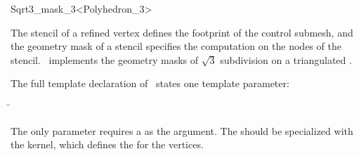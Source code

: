 \ccRefPageEnd


\begin{ccRefClass}{Sqrt3_mask_3<Polyhedron_3>}

\ccDefinition

The stencil of a refined vertex defines the footprint of the 
control submesh, and the geometry mask of a stencil specifies
the computation on the nodes of the stencil.
\ccClassTemplateName\ implements the geometry masks of 
$\sqrt{3}$ subdivision on a triangulated 
.


\ccParameters

The full template declaration of \ccClassTemplateName\ states one
template parameter:

\begin{tabbing}
 \= 
\end{tabbing}
   
The only parameter requires a  as the argument. The
 should be specialized with the 
kernel, which defines the  for the vertices.

\ccCreation
{}


\ccThreeToTwo



\ccSeeAlso

\\

\end{ccRefClass}

\ccRefPageEnd

